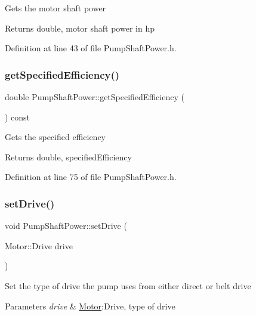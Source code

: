 Gets the motor shaft power \begin{DoxyReturn}{Returns}
double, motor shaft power in hp 
\end{DoxyReturn}


Definition at line 43 of file Pump\+Shaft\+Power.\+h.

\mbox{\label{class_pump_shaft_power_a93c70d2b6f70d6d98b97859fc095193a}} 
\subsubsection{\texorpdfstring{get\+Specified\+Efficiency()}{getSpecifiedEfficiency()}}
{\footnotesize\ttfamily double Pump\+Shaft\+Power\+::get\+Specified\+Efficiency (\begin{DoxyParamCaption}{ }\end{DoxyParamCaption}) const\hspace{0.3cm}{\ttfamily [inline]}}

Gets the specified efficiency \begin{DoxyReturn}{Returns}
double, specified\+Efficiency 
\end{DoxyReturn}


Definition at line 75 of file Pump\+Shaft\+Power.\+h.

\mbox{\label{class_pump_shaft_power_a5cbcf0acd63ae4a2ffe9a5c13ba73a3a}} 
\subsubsection{\texorpdfstring{set\+Drive()}{setDrive()}}
{\footnotesize\ttfamily void Pump\+Shaft\+Power\+::set\+Drive (\begin{DoxyParamCaption}\item[{Motor\+::\+Drive}]{drive }\end{DoxyParamCaption})\hspace{0.3cm}{\ttfamily [inline]}}

Set the type of drive the pump uses from either direct or belt drive 
\begin{DoxyParams}{Parameters}
{\em drive} & \hyperlink{struct_motor}{Motor}\+:Drive, type of drive \\
\hline
\end{DoxyParams}


